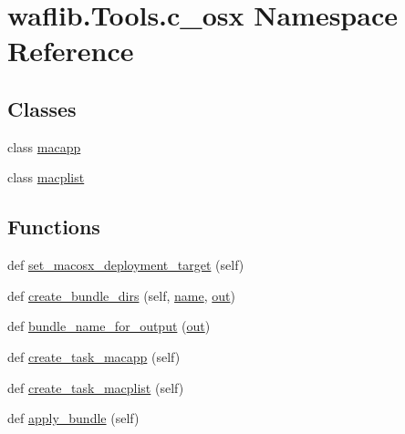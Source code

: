 \hypertarget{namespacewaflib_1_1_tools_1_1c__osx}{}\section{waflib.\+Tools.\+c\+\_\+osx Namespace Reference}
\label{namespacewaflib_1_1_tools_1_1c__osx}
\subsection*{Classes}
\begin{DoxyCompactItemize}
\item 
class \hyperlink{classwaflib_1_1_tools_1_1c__osx_1_1macapp}{macapp}
\item 
class \hyperlink{classwaflib_1_1_tools_1_1c__osx_1_1macplist}{macplist}
\end{DoxyCompactItemize}
\subsection*{Functions}
\begin{DoxyCompactItemize}
\item 
def \hyperlink{namespacewaflib_1_1_tools_1_1c__osx_a67e1ae8c729eb758994130363dff444f}{set\+\_\+macosx\+\_\+deployment\+\_\+target} (self)
\item 
def \hyperlink{namespacewaflib_1_1_tools_1_1c__osx_ab3377b71b8d33ceb64e0c06c684c2634}{create\+\_\+bundle\+\_\+dirs} (self, \hyperlink{lib_2expat_8h_a1b49b495b59f9e73205b69ad1a2965b0}{name}, \hyperlink{latency_8c_a71fd1c281affec034757279e4f91c50b}{out})
\item 
def \hyperlink{namespacewaflib_1_1_tools_1_1c__osx_a6a31f6c29d3177dc450458c417f324cd}{bundle\+\_\+name\+\_\+for\+\_\+output} (\hyperlink{latency_8c_a71fd1c281affec034757279e4f91c50b}{out})
\item 
def \hyperlink{namespacewaflib_1_1_tools_1_1c__osx_a3487cc571495703db801559dc8561442}{create\+\_\+task\+\_\+macapp} (self)
\item 
def \hyperlink{namespacewaflib_1_1_tools_1_1c__osx_af78321a588117b8eaec10395a24d55be}{create\+\_\+task\+\_\+macplist} (self)
\item 
def \hyperlink{namespacewaflib_1_1_tools_1_1c__osx_aab6f1a2bc87d4ef6fef8a3beb0b703d8}{apply\+\_\+bundle} (self)
\end{DoxyCompactItemize}
